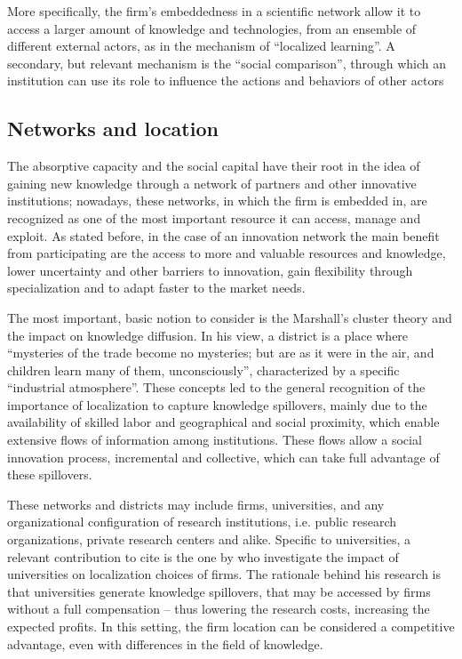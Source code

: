 More specifically, the firm's embeddedness in a scientific network allow it to access a larger amount of knowledge and technologies, from an ensemble of different external actors, as in the mechanism of \enquote{localized learning}. A secondary, but relevant mechanism is the \enquote{social comparison}, through which an institution can use its role to influence the actions and behaviors of other actors \citep{Slavova2015}

\subsection{Networks and location}
The absorptive capacity and the social capital have their root in the idea of gaining new knowledge through a network of partners and other innovative institutions; nowadays, these networks, in which the firm is embedded in, are recognized as one of the most important resource it can access, manage and exploit. As stated before, in the case of an innovation network the main benefit from participating are the access to more and valuable resources and knowledge, lower uncertainty and other barriers to innovation, gain flexibility through specialization and to adapt faster to the market needs. 

The most important, basic notion to consider is the Marshall's cluster theory \citep{Marshall1890} and the impact on knowledge diffusion. In his view, a district is a place where \enquote{mysteries of the trade become no mysteries; but are as it were in the air, and children learn many of them, unconsciously}, characterized by a specific \enquote{industrial atmosphere}. These concepts led to the general recognition of the importance of localization to capture knowledge spillovers, mainly due to the availability of skilled labor and geographical and social proximity, which enable extensive flows of information among institutions. These flows allow a social innovation process, incremental and collective, which can take full advantage of these spillovers.

These networks and districts may include firms, universities, and any organizational configuration of research institutions, i.e. public research organizations, private research centers and alike. Specific to universities, a relevant contribution to cite is the one by \citet{Audretsch2004} who investigate the impact of universities on localization choices of firms. The rationale behind his research is that universities generate knowledge spillovers, that may be accessed by firms without a full compensation – thus lowering the research costs, increasing the expected profits. In this setting, the firm location can be considered a competitive advantage, even with differences in the field of knowledge. 


